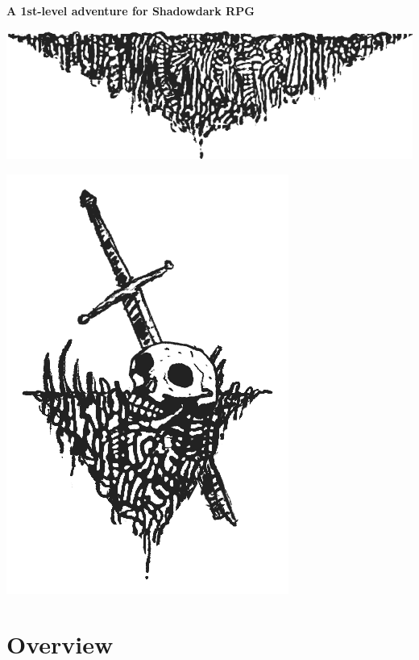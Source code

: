 \documentclass[
  10pt,
  titlepage=firstiscover,
  toc=flat,
  twoside]{scrreprt}
\begin{document}
\begin{center}

\vspace{-5mm}

\vspace{-3mm}

\sffamily\normalsize\bfseries{A 1st-level adventure for Shadowdark RPG}

\includegraphics{_extensions/shadowdark/assets/ShadowDark_Page-Art_Triangle_01.png}

\vfill

\includegraphics{_extensions/shadowdark/assets/ShadowDark_Spot-Art_001.png}

\end{center}

\chapter{Overview}\label{overview}
\end{document}
